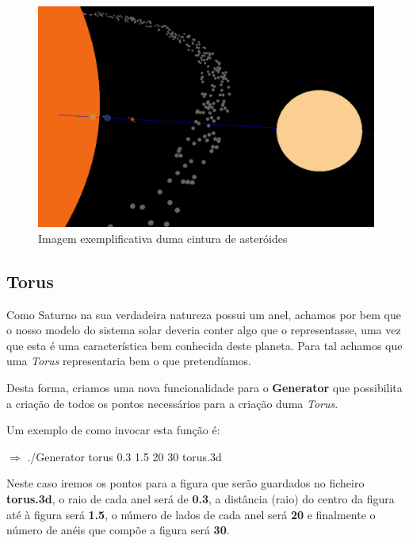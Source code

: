\documentclass[a4paper]{article}
\begin{document}
\begin{figure}[H]
\centering
\includegraphics[scale=0.45]{cintura.png}
\caption{Imagem exemplificativa duma cintura de asteróides}
\label{img:cintura}
\end{figure}



\subsection{Torus}

Como Saturno na sua verdadeira natureza possui um anel, achamos por bem que o nosso modelo do sistema solar deveria conter algo que o representasse, uma vez que esta é uma característica bem conhecida deste planeta. Para tal achamos que uma \emph{Torus} representaria bem o que pretendíamos.

Desta forma, criamos uma nova funcionalidade para o \textbf{Generator} que possibilita a criação de todos os pontos necessários para a criação duma \emph{Torus}.

Um exemplo de como invocar esta função é:

 \vspace{0.5cm}

$\Rightarrow$ ./Generator torus 0.3 1.5 20 30 torus.3d

 \vspace{0.5cm}

 Neste caso iremos os pontos para a figura que serão guardados no ficheiro \textbf{torus.3d}, o raio de cada anel será de \textbf{0.3}, a distância (raio) do centro da figura até à figura será \textbf{1.5}, o número de lados de cada anel será \textbf{20} e finalmente o número de anéis que compõe a figura será \textbf{30}.
\end{document}
